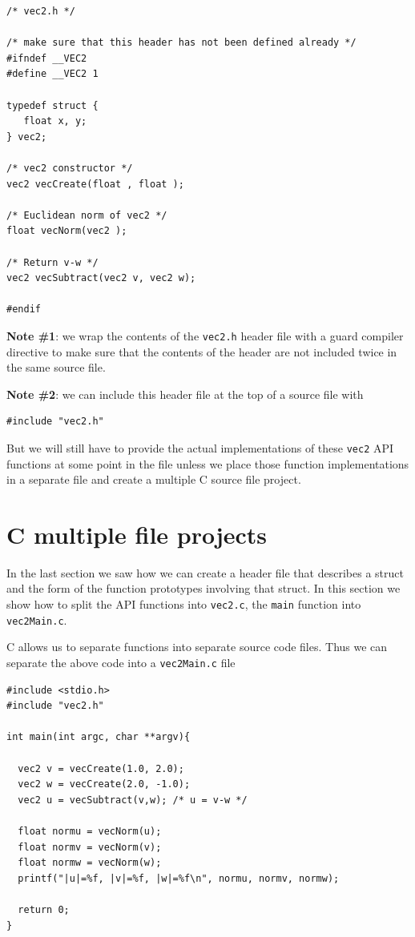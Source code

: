 \begin{verbatim}
/* vec2.h */

/* make sure that this header has not been defined already */
#ifndef __VEC2
#define __VEC2 1

typedef struct {
   float x, y;
} vec2;

/* vec2 constructor */
vec2 vecCreate(float , float );

/* Euclidean norm of vec2 */
float vecNorm(vec2 );

/* Return v-w */
vec2 vecSubtract(vec2 v, vec2 w);

#endif
\end{verbatim}

{\bf Note \#1}: we wrap the contents of the \texttt{vec2.h} header file with a guard compiler directive to make sure that the contents of the header are not included twice in the same source file.

{\bf Note \#2}: we can include this header file at the top of a source file with 

\begin{verbatim}
#include "vec2.h"
\end{verbatim}

But we will still have to provide the actual implementations of these \texttt{vec2} API functions at some point in the file unless we place those function implementations in a separate file and create a multiple C source file project.

\section{C multiple file projects}

In the last section we saw how we can create a header file that describes a struct and the form of the function prototypes involving that struct. In this section we show how to split the API functions into \texttt{vec2.c}, the \texttt{main} function into \texttt{vec2Main.c}.

C allows us to separate functions into separate source code files. Thus we can separate the above code into a \texttt{vec2Main.c} file

\begin{verbatim}
#include <stdio.h>
#include "vec2.h"

int main(int argc, char **argv){

  vec2 v = vecCreate(1.0, 2.0);
  vec2 w = vecCreate(2.0, -1.0);
  vec2 u = vecSubtract(v,w); /* u = v-w */
 
  float normu = vecNorm(u);
  float normv = vecNorm(v);
  float normw = vecNorm(w);
  printf("|u|=%f, |v|=%f, |w|=%f\n", normu, normv, normw);

  return 0;
}
\end{verbatim}


